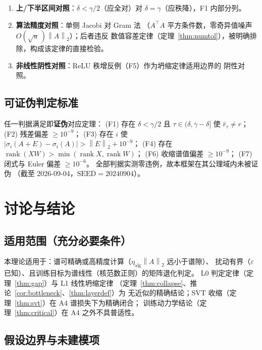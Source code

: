 \documentclass[UTF8,11pt,a4paper]{ctexart}
\theoremstyle{plain}
\theoremstyle{definition}
\theoremstyle{remark}
\newcommand{\rank}{\operatorname{rank}}
\newcommand{\Tnorm}[1]{\left\lVert #1\right\rVert_2}
\begin{document}
\begin{enumerate}
\item \textbf{上/下半区间对照}：$\delta<\gamma/2$（应全对）对
  $\delta=\gamma$（应秩降），F1 内部分列。
\item \textbf{算法精度对照}：单侧 Jacobi 对 Gram 法
  （$A^\top A$ 平方条件数，零奇异值噪声 $O(\sqrt u\,)\Tnorm{A}$）；后者违反
  数值容差定律（定理~\ref{thm:numtol}），被明确排除，构成该定律的直接检验。
\item \textbf{非线性阴性对照}：ReLU 秩增反例（F5）作为坍缩定律适用边界的
  阴性对照。
\end{enumerate}

\subsection{可证伪判定标准}

任一判据满足即\textbf{证伪}对应定理：
(F1) 存在 $\delta<\gamma/2$ 且 $\tau\in(\delta,\gamma-\delta]$ 使
$\hat r_\tau\ne r$；
(F2) 残差偏差 $\ge10^{-9}$；
(F3) 存在 $i$ 使 $|\sigma_i(A{+}E)-\sigma_i(A)|>\Tnorm{E}+10^{-9}$；
(F4) 存在 $\rank(XW)>\min(\rank X,\rank W)$；
(F6) 收缩谱值偏差 $\ge10^{-9}$；
(F7) 闭式与 Euler 偏差 $\ge10^{-6}$。
全部判据实测零违例，故本框架在其公理域内未被证伪
（截至 2026-09-04，$\mathrm{SEED}=20240904$）。

\section{讨论与结论}\label{sec:discussion}

\subsection{适用范围（充分必要条件）}

本理论适用于：谱可精确或高精度计算（$\eta_{\mathrm{alg}}\Tnorm{A}$ 远小于谱隙）、
扰动有界（$\varepsilon$ 已知）、且训练目标为谱线性（核范数正则）的矩阵退化判定。
L0 判定定律（定理~\ref{thm:gap}）与 L1 线性坍缩定律
（定理~\ref{thm:collapse}、推论~\ref{cor:bottleneck}、\ref{thm:layerdef}）为
无近似的精确结论；SVT 收缩（定理~\ref{thm:svt}）在 A4 谱损失下为精确闭合；
训练动力学结论（定理~\ref{thm:critical}）在 A4 之外不具普适性。

\subsection{假设边界与未建模项}
\end{document}
